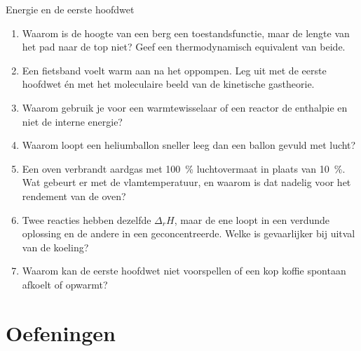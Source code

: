 \begin{reflectie}{Energie en de eerste hoofdwet}
\begin{enumerate}
\item Waarom is de hoogte van een berg een toestandsfunctie, maar de lengte van het pad naar de top niet? Geef een thermodynamisch equivalent van beide.
\item Een fietsband voelt warm aan na het oppompen. Leg uit met de eerste hoofdwet \'en met het moleculaire beeld van de kinetische gastheorie.
\item Waarom gebruik je voor een warmtewisselaar of een reactor de enthalpie en niet de interne energie?
\item Waarom loopt een heliumballon sneller leeg dan een ballon gevuld met lucht?
\item Een oven verbrandt aardgas met \SI{100}{\percent} luchtovermaat in plaats van \SI{10}{\percent}. Wat gebeurt er met de vlamtemperatuur, en waarom is dat nadelig voor het rendement van de oven?
\item Twee reacties hebben dezelfde $\Delta_r H$, maar de ene loopt in een verdunde oplossing en de andere in een geconcentreerde. Welke is gevaarlijker bij uitval van de koeling?
\item Waarom kan de eerste hoofdwet niet voorspellen of een kop koffie spontaan afkoelt of opwarmt?
\end{enumerate}
\end{reflectie}

\newpage
\section{Oefeningen}


